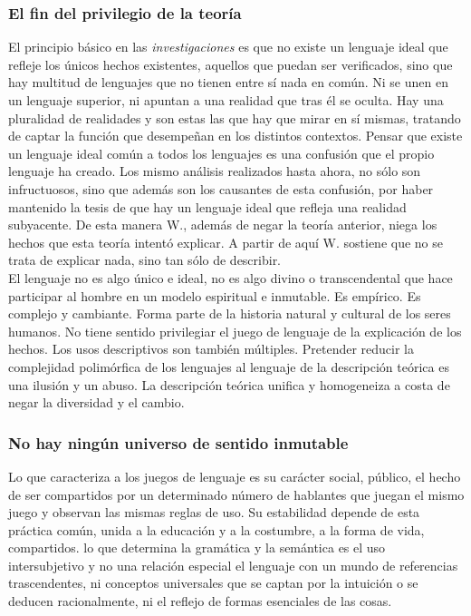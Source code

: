 \documentclass[a4paper, 11pt, twocolumn, spanish]{article}
\begin{document}
\subsubsection{El fin del privilegio de la teoría}
\label{sec:org97bf78f}
El principio básico en las \emph{investigaciones} es que no existe un
lenguaje ideal que refleje los únicos hechos existentes, aquellos que
puedan ser verificados, sino que hay multitud de lenguajes que no
tienen entre sí nada en común. Ni se unen en un lenguaje superior, ni
apuntan a una realidad que tras él se oculta. Hay una pluralidad de
realidades y son estas las que hay que mirar en sí mismas, tratando de
captar la función que desempeñan en los distintos contextos. Pensar
que existe un lenguaje ideal común a todos los lenguajes es una
confusión que el propio lenguaje ha creado. Los mismo análisis
realizados hasta ahora, no sólo son infructuosos, sino que además son
los causantes de esta confusión, por haber mantenido la tesis de que
hay un lenguaje ideal que refleja una realidad subyacente. De esta
manera W., además de negar la teoría anterior, niega los hechos que
esta teoría intentó explicar. A partir de aquí W. sostiene que no se
trata de explicar nada, sino tan sólo de describir.\\

El lenguaje no es algo único e ideal, no es algo divino o
transcendental que hace participar al hombre en un modelo espiritual e
inmutable. Es empírico. Es complejo y cambiante. Forma parte de la
historia natural y cultural de los seres humanos. No tiene sentido
privilegiar el juego de lenguaje de la explicación de los hechos. Los
usos descriptivos son también múltiples. Pretender reducir la
complejidad polimórfica de los lenguajes al lenguaje de la descripción
teórica es una ilusión y un abuso. La descripción teórica unifica y
homogeneiza a costa de negar la diversidad y el cambio.\\

\subsubsection{No hay ningún universo de sentido inmutable}
\label{sec:orgfbad37c}
Lo que caracteriza a los juegos de lenguaje es su carácter social,
público, el hecho de ser compartidos por un determinado número de
hablantes que juegan el mismo juego y observan las mismas reglas de
uso. Su estabilidad depende de esta práctica común, unida a la
educación y a la costumbre, a la forma de vida, compartidos. lo que
determina la gramática y la semántica es el uso intersubjetivo y no
una relación especial el lenguaje con un mundo de referencias
trascendentes, ni conceptos universales que se captan por la intuición
o se deducen racionalmente, ni el reflejo de formas esenciales de las
cosas.\\
\end{document}
